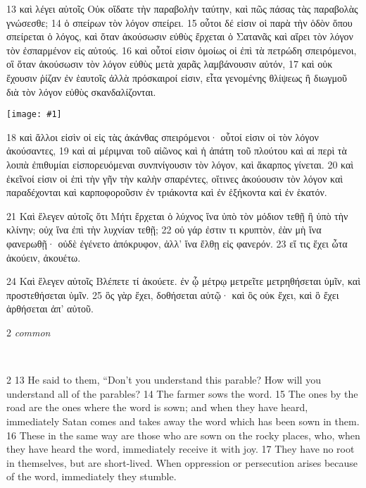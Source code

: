 \documentclass[10pt,a5paper,twoside,twocolumn]{book}
\newcommand{\fig}[1]{\texttt{[image: \#1]}\label{fig:#1}}
\newcommand*\cleartoleftpage{%
  \ifodd\value{page}\hbox{}\clearpage\fi
}
\newcommand{\separator}{
  \vspace{-0.5\baselineskip}%
  \hspace{0.27\textwidth}%
  \noindent\makebox[\linewidth]{\resizebox{0.3333\linewidth}{1pt}{$\bullet$}}\bigskip%
  \vspace{-0.5\baselineskip}
}
\newenvironment{facing}{\cleartoleftpage}{\clearpage\pagebreak}
\newenvironment{help}{\clearpage}{}
\newenvironment{helpsec}{\begin{minipage}[t]{\textwidth}\begin{multicols}{2}}{\end{multicols}\end{minipage}}
\newenvironment{vocab}{\begin{helpsec}}{\end{helpsec}}
\newenvironment{translation}{\separator\\\begin{helpsec}\footnotesize}{\end{helpsec}}
\begin{document}
\begin{facing}

13 καὶ λέγει αὐτοῖς Οὐκ οἴδατε τὴν παραβολὴν ταύτην, καὶ πῶς πάσας τὰς παραβολὰς γνώσεσθε; 14 ὁ σπείρων τὸν λόγον σπείρει. 15 οὗτοι δέ εἰσιν οἱ παρὰ τὴν ὁδὸν ὅπου σπείρεται ὁ λόγος, καὶ ὅταν ἀκούσωσιν εὐθὺς ἔρχεται ὁ Σατανᾶς καὶ αἴρει τὸν λόγον τὸν ἐσπαρμένον εἰς αὐτούς. 16 καὶ οὗτοί εἰσιν ὁμοίως οἱ ἐπὶ τὰ πετρώδη σπειρόμενοι, οἳ ὅταν ἀκούσωσιν τὸν λόγον εὐθὺς μετὰ χαρᾶς λαμβάνουσιν αὐτόν, 17 καὶ οὐκ ἔχουσιν ῥίζαν ἐν ἑαυτοῖς ἀλλὰ πρόσκαιροί εἰσιν, εἶτα γενομένης θλίψεως ἢ διωγμοῦ διὰ τὸν λόγον εὐθὺς σκανδαλίζονται. 

\fig{04-19} %

18 καὶ ἄλλοι εἰσὶν οἱ εἰς τὰς ἀκάνθας σπειρόμενοι· οὗτοί εἰσιν οἱ τὸν λόγον ἀκούσαντες, 19 καὶ αἱ μέριμναι τοῦ αἰῶνος καὶ ἡ ἀπάτη τοῦ πλούτου καὶ αἱ περὶ τὰ λοιπὰ ἐπιθυμίαι εἰσπορευόμεναι συνπνίγουσιν τὸν λόγον, καὶ ἄκαρπος γίνεται. 20 καὶ ἐκεῖνοί εἰσιν οἱ ἐπὶ τὴν γῆν τὴν καλὴν σπαρέντες, οἵτινες ἀκούουσιν τὸν λόγον καὶ παραδέχονται καὶ καρποφοροῦσιν ἐν τριάκοντα καὶ ἐν ἑξήκοντα καὶ ἐν ἑκατόν. 

\vfill

21 Καὶ ἔλεγεν αὐτοῖς ὅτι Μήτι ἔρχεται ὁ λύχνος ἵνα ὑπὸ τὸν μόδιον τεθῇ ἢ ὑπὸ τὴν κλίνην; οὐχ ἵνα ἐπὶ τὴν λυχνίαν τεθῇ; 22 οὐ γάρ ἐστιν τι κρυπτὸν, ἐὰν μὴ ἵνα φανερωθῇ· οὐδὲ ἐγένετο ἀπόκρυφον, ἀλλ’ ἵνα ἔλθῃ εἰς φανερόν. 23 εἴ τις ἔχει ὦτα ἀκούειν, ἀκουέτω. 

\vfill

24 Καὶ ἔλεγεν αὐτοῖς Βλέπετε τί ἀκούετε. ἐν ᾧ μέτρῳ μετρεῖτε μετρηθήσεται ὑμῖν, καὶ προστεθήσεται ὑμῖν. 25 ὃς γὰρ ἔχει, δοθήσεται αὐτῷ· καὶ ὃς οὐκ ἔχει, καὶ ὃ ἔχει ἀρθήσεται ἀπ’ αὐτοῦ. 


\begin{help}
\begin{vocab}
\emph{common}\\

\end{vocab}
\begin{translation}
 13 He said to them, ``Don't you understand this parable? How will you understand all of the parables? 14  The farmer sows the word. 15  The ones by the road are the ones where the word is sown; and when they have heard, immediately Satan comes and takes away the word which has been sown in them. 16  These in the same way are those who are sown on the rocky places, who, when they have heard the word, immediately receive it with joy. 17  They have no root in themselves, but are short-lived. When oppression or persecution arises because of the word, immediately they stumble. 


\end{translation}
\end{help}
\end{facing}
\end{document}
